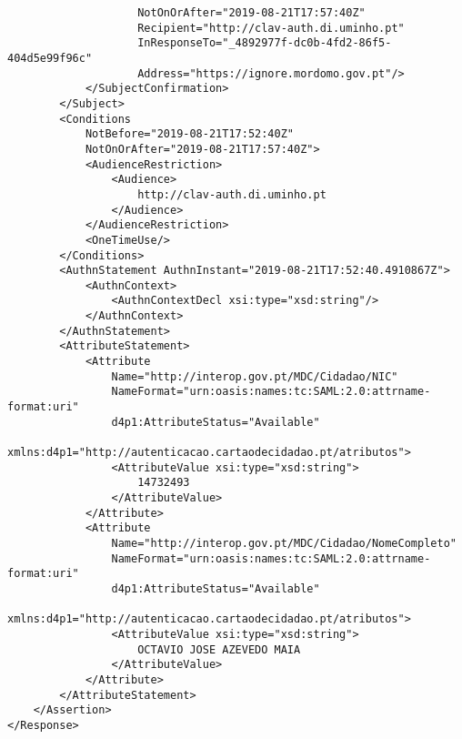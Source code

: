 \begin{lstlisting}
                    NotOnOrAfter="2019-08-21T17:57:40Z" 
                    Recipient="http://clav-auth.di.uminho.pt" 
                    InResponseTo="_4892977f-dc0b-4fd2-86f5-404d5e99f96c" 
                    Address="https://ignore.mordomo.gov.pt"/>
            </SubjectConfirmation>
        </Subject>
        <Conditions 
            NotBefore="2019-08-21T17:52:40Z" 
            NotOnOrAfter="2019-08-21T17:57:40Z">
            <AudienceRestriction>
                <Audience>
                    http://clav-auth.di.uminho.pt
                </Audience>
            </AudienceRestriction>
            <OneTimeUse/>
        </Conditions>
        <AuthnStatement AuthnInstant="2019-08-21T17:52:40.4910867Z">
            <AuthnContext>
                <AuthnContextDecl xsi:type="xsd:string"/>
            </AuthnContext>
        </AuthnStatement>
        <AttributeStatement>
            <Attribute 
                Name="http://interop.gov.pt/MDC/Cidadao/NIC" 
                NameFormat="urn:oasis:names:tc:SAML:2.0:attrname-format:uri" 
                d4p1:AttributeStatus="Available" 
                xmlns:d4p1="http://autenticacao.cartaodecidadao.pt/atributos">
                <AttributeValue xsi:type="xsd:string">
                    14732493
                </AttributeValue>
            </Attribute>
            <Attribute 
                Name="http://interop.gov.pt/MDC/Cidadao/NomeCompleto" 
                NameFormat="urn:oasis:names:tc:SAML:2.0:attrname-format:uri" 
                d4p1:AttributeStatus="Available" 
                xmlns:d4p1="http://autenticacao.cartaodecidadao.pt/atributos">
                <AttributeValue xsi:type="xsd:string">
                    OCTAVIO JOSE AZEVEDO MAIA
                </AttributeValue>
            </Attribute>
        </AttributeStatement>
    </Assertion>
</Response>
\end{lstlisting}